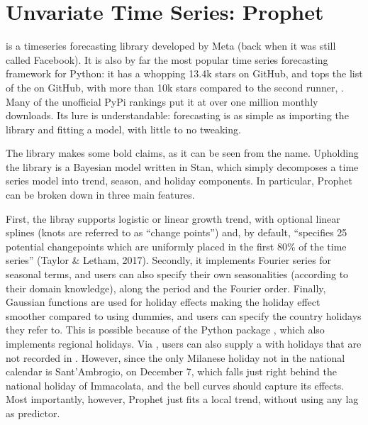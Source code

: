 \documentclass[letterpaper,10pt,english]{jupyterBook}
\begin{document}
\section{Unvariate Time Series: Prophet}
\label{\detokenize{06-forecasting:unvariate-time-series-prophet}}
\sphinxAtStartPar
{} is a time\sphinxhyphen{}series forecasting library developed by Meta (back when it was still called Facebook). It is also by far the most popular time series forecasting framework for Python: it has a whopping 13.4k stars on GitHub, and tops the list of the   on GitHub, with more than 10k stars compared to the second runner, . Many of the \sphinxhyphen{} unofficial \sphinxhyphen{} PyPi rankings  put it at over one million monthly downloads. Its lure is understandable: forecasting is as simple as importing the library and fitting a model, with little to no tweaking.

\sphinxAtStartPar
The library makes some bold claims, as it can be seen from the name. Upholding the library is a Bayesian model written in Stan, which simply decomposes a time series model into trend, season, and holiday components. In particular, Prophet can be broken down in three main features.

\sphinxAtStartPar
First, the libray supports logistic or linear growth trend, with optional linear splines (knots are referred to as “change points”) and, by default, “specifies 25 potential changepoints which are uniformly placed in the first 80\% of the time series” (Taylor \& Letham, 2017). Secondly, it implements Fourier series for seasonal terms, and users can also specify their own seasonalities (according to their domain knowledge), along the period and the Fourier order. Finally, Gaussian functions are used for holiday effects \sphinxhyphen{} making the holiday effect smoother compared to using dummies, and users can specify the country holidays they refer to. This is possible because of the Python package , which also implements regional holidays. Via , users can also supply a  with holidays that are not recorded in . However, since the only Milanese holiday not in the national calendar is Sant’Ambrogio, on December 7, which falls just right behind the national holiday of Immacolata, and the bell curves should capture its effects. Most importantly, however, Prophet just fits a local trend, without using any lag as predictor.
\end{document}
